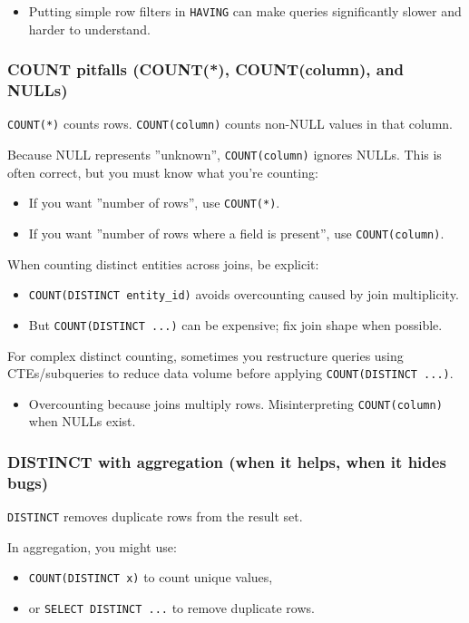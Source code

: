 \Pitfall
\begin{itemize}
  \item Putting simple row filters in \texttt{HAVING} can make queries significantly slower 
  and harder to understand.
\end{itemize}

\subsubsection{COUNT pitfalls (COUNT(*), COUNT(column), and NULLs)}
\J \texttt{COUNT(*)} counts rows. \texttt{COUNT(column)} counts non-NULL values in that column.

\M Because NULL represents ''unknown'', \texttt{COUNT(column)} ignores NULLs. This is often 
correct, but you must know what you're counting:
\begin{itemize}
  \item If you want ''number of rows'', use \texttt{COUNT(*)}.
  \item If you want ''number of rows where a field is present'', use \texttt{COUNT(column)}.
\end{itemize}

\Sx When counting distinct entities across joins, be explicit:
\begin{itemize}
  \item \texttt{COUNT(DISTINCT entity\_id)} avoids overcounting caused by join multiplicity.
  \item But \texttt{COUNT(DISTINCT ...)} can be expensive; fix join shape when possible.
\end{itemize}

\E For complex distinct counting, sometimes you restructure queries using CTEs/subqueries 
to reduce data volume before applying \texttt{COUNT(DISTINCT ...)}.

\Pitfall
\begin{itemize}
  \item Overcounting because joins multiply rows. Misinterpreting \texttt{COUNT(column)} 
  when NULLs exist.
\end{itemize}

\subsubsection{DISTINCT with aggregation (when it helps, when it hides bugs)}
\J \texttt{DISTINCT} removes duplicate rows from the result set.

\M In aggregation, you might use:
\begin{itemize}
  \item \texttt{COUNT(DISTINCT x)} to count unique values,
  \item or \texttt{SELECT DISTINCT ...} to remove duplicate rows.
\end{itemize}


